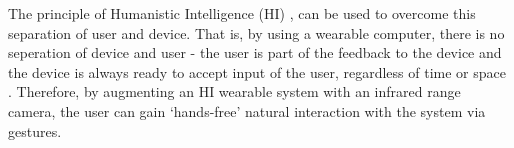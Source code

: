 \documentclass[conference]{IEEEtran}
\begin{document}
The principle of Humanistic Intelligence (HI) \cite{mann2001wearable}, can be used to overcome this separation of user and device. That is, by using a wearable computer, there is no seperation of device and user - the user is part of the feedback to the device and the device is always ready to accept input of the user, regardless of time or space \cite{mann2002wearcam, mann2002wearable, mannaaai361, mistry2009sixthsense}. Therefore, by augmenting an HI wearable system with an infrared range camera, the user can gain `hands-free' natural interaction with the system via gestures.
%
%
\end{document}
